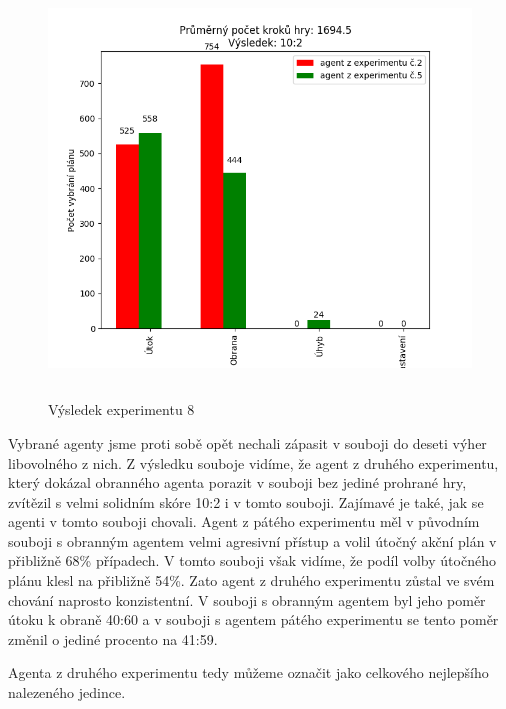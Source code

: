 \begin{figure}[H]\centering
\includegraphics[width=145mm, height=110mm]{./Obrazky/Experiment08Results.png}
\caption{Výsledek experimentu 8}
\label{Výsledek experimentu 08}
\end{figure}

Vybrané agenty jsme proti sobě opět nechali zápasit v souboji do deseti výher libovolného z nich.
Z výsledku souboje vidíme, že agent z druhého experimentu, který dokázal obranného agenta porazit v souboji bez jediné prohrané hry, zvítězil s velmi solidním skóre 10:2 i v tomto souboji.
Zajímavé je také, jak se agenti v tomto souboji chovali.
Agent z pátého experimentu měl v původním souboji s obranným agentem velmi agresivní přístup a volil útočný akční plán v přibližně 68\% případech.
V tomto souboji však vidíme, že podíl volby útočného plánu klesl na přibližně 54\%.
Zato agent z druhého experimentu zůstal ve svém chování naprosto konzistentní. V souboji s obranným agentem byl jeho poměr útoku k obraně 40:60 a v souboji s agentem pátého experimentu se tento poměr změnil o jediné procento na 41:59.
\par
Agenta z druhého experimentu tedy můžeme označit jako celkového nejlepšího nalezeného jedince.

